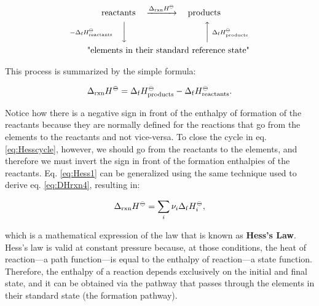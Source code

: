 \documentclass[
]{book}
\theoremstyle{definition}
\theoremstyle{definition}
\theoremstyle{definition}
\theoremstyle{remark}
\begin{document}
\begin{equation}
\begin{aligned}
 \text{reactants} & \quad \xrightarrow{\Delta_{\text{rxn}} H^{-\kern-6pt{\ominus}\kern-6pt-}} \quad \text{products} \\
\scriptstyle{-\Delta_{\text{f}} H_{\text{reactants}}^{-\kern-6pt{\ominus}\kern-6pt-}} \quad \bigg\downarrow \quad & \qquad \qquad \qquad \qquad \scriptstyle{\bigg\uparrow  \; \Delta_{\text{f}} H_{\text{products}}^{-\kern-6pt{\ominus}\kern-6pt-}} \\
 \text{"elements in } & \text{their standard reference state"}
\end{aligned}
\label{eq:Hesscycle}
\end{equation}

This process is summarized by the simple formula:

\begin{equation}
  \Delta_{\text{rxn}} H^{-\kern-6pt{\ominus}\kern-6pt-}= \Delta_{\mathrm{f}} H_{\text{products}}^{-\kern-6pt{\ominus}\kern-6pt-}- \Delta_{\mathrm{f}} H_{\text{reactants}}^{-\kern-6pt{\ominus}\kern-6pt-}.
  \label{eq:Hess1}
\end{equation}

Notice how there is a negative sign in front of the enthalpy of formation of the reactants because they are normally defined for the reactions that go from the elements to the reactants and not vice-versa. To close the cycle in eq. \eqref{eq:Hesscycle}, however, we should go from the reactants to the elements, and therefore we must invert the sign in front of the formation enthalpies of the reactants. Eq. \eqref{eq:Hess1} can be generalized using the same technique used to derive eq. \eqref{eq:DHrxn4}, resulting in:

\begin{equation}
  \Delta_{\text{rxn}} H^{-\kern-6pt{\ominus}\kern-6pt-}= \sum_i \nu_i \Delta_{\mathrm{f}} H_i^{-\kern-6pt{\ominus}\kern-6pt-},
  \label{eq:Hess}
\end{equation}

which is a mathematical expression of the law that is known as \textbf{Hess's Law}. Hess's law is valid at constant pressure because, at those conditions, the heat of reaction---a path function---is equal to the enthalpy of reaction---a state function. Therefore, the enthalpy of a reaction depends exclusively on the initial and final state, and it can be obtained via the pathway that passes through the elements in their standard state (the formation pathway).
\end{document}
